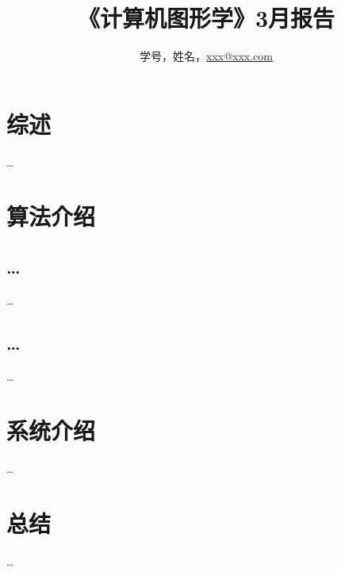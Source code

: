 \documentclass[a4paper,UTF8]{article}
\theoremstyle{definition}
\begin{document}
\title{\textbf{《计算机图形学》3月报告}}
\author{学号，姓名，\href{mailto:xxx@xxx.com}{xxx@xxx.com}}
\maketitle

\section{综述}
\dots

\section{算法介绍}
\subsection{\dots}
\dots
\subsection{\dots}
\dots
		
\section{系统介绍}
\dots

\section{总结}
\dots

%

\end{document}
